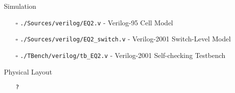 \begin{center}
    Simulation
    \begin{itemize}
        \item[$\square$] \texttt{./Sources/verilog/EQ2.v} - Verilog-95 Cell Model
        \item[$\square$] \texttt{./Sources/verilog/EQ2\_switch.v} - Verilog-2001 Switch-Level Model
        \item[$\square$] \texttt{./TBench/verilog/tb\_EQ2.v} - Verilog-2001 Self-checking Testbench
    \end{itemize}
    Physical Layout
    \begin{itemize}
        \item[\checkmark] \texttt{?}
    \end{itemize}
\end{center}
